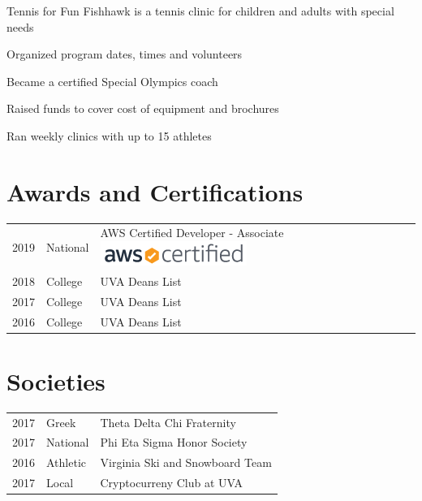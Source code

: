 \documentclass[]{deedy-resume-openfont}
\begin{document}
\begin{minipage}[t]{0.66\textwidth}
\begin{tightemize}
\item 	Tennis for Fun Fishhawk is a tennis clinic for children and adults with special needs\item 	Organized program dates, times and volunteers \item Became a certified Special Olympics coach \item	Raised funds to cover cost of equipment and brochures \item  Ran weekly clinics with up to 15 athletes  \end{tightemize}
\sectionsep



\section{Awards and Certifications} 
\begin{tabular}{rll}
2019 & National & AWS Certified Developer - Associate       \includegraphics[scale=.35]{aws-certified-logo_color-horz_180x30.png}\\
2018 & College & UVA Deans List \\
2017 & College & UVA Deans List \\
2016 & College & UVA Deans List \\

\end{tabular}
\sectionsep


\section{Societies} 

\begin{tabular}{rll}
2017 	& Greek    & Theta Delta Chi Fraternity\\
2017   & National   & Phi Eta Sigma Honor Society\\
2016  & Athletic    & Virginia Ski and Snowboard Team \\
2017   & Local  &    Cryptocurreny Club at UVA
\end{tabular}
\sectionsep

\end{minipage} 
\end{document}
